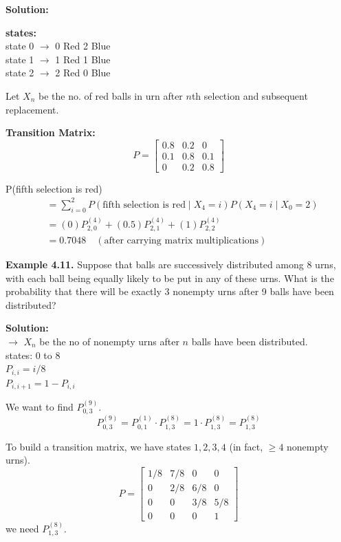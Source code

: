 \documentclass[12pt,a4paper]{article}
\begin{document}
\textbf{Solution:}

\vspace{0.2cm}
\begin{minipage}[t]{0.5\textwidth}
\textbf{states:} \\
state 0 $\rightarrow$ 0 Red 2 Blue \\
state 1 $\rightarrow$ 1 Red 1 Blue \\
state 2 $\rightarrow$ 2 Red 0 Blue
\end{minipage}
\begin{minipage}[t]{0.45\textwidth}
Let $X_n$ be the no. of red balls in urn after $n$th selection and subsequent replacement.
\end{minipage}

\vspace{0.5cm}
\textbf{Transition Matrix:}
\[ P = \begin{bmatrix} 0.8 & 0.2 & 0 \\ 0.1 & 0.8 & 0.1 \\ 0 & 0.2 & 0.8 \end{bmatrix} \]

P(fifth selection is red)
\begin{align*}
    &= \sum_{i=0}^2 P(\text{fifth selection is red} \mid X_4 = i) P(X_4 = i \mid X_0 = 2) \\
    &= (0) P_{2,0}^{(4)} + (0.5) P_{2,1}^{(4)} + (1) P_{2,2}^{(4)} \\
    &= 0.7048 \quad (\text{after carrying matrix multiplications})
\end{align*}

\newpage

\textbf{Example 4.11.} Suppose that balls are successively distributed among 8 urns, with
each ball being equally likely to be put in any of these urns. What is the probability
that there will be exactly 3 nonempty urns after 9 balls have been distributed?

\textbf{Solution:} \\
$\rightarrow$ $X_n$ be the no of nonempty urns after $n$ balls have been distributed. \\
states: $0$ to $8$ \\
$P_{i,i} = i/8$ \\
$P_{i,i+1} = 1 - P_{i,i}$

We want to find $P_{0,3}^{(9)}$.
\[ P_{0,3}^{(9)} = P_{0,1}^{(1)} \cdot P_{1,3}^{(8)} = 1 \cdot P_{1,3}^{(8)} = P_{1,3}^{(8)} \]

To build a transition matrix, we have states $1, 2, 3, 4$ (in fact, $\geq 4$ nonempty urns).
\[ P = \begin{bmatrix} 1/8 & 7/8 & 0 & 0 \\ 0 & 2/8 & 6/8 & 0 \\ 0 & 0 & 3/8 & 5/8 \\ 0 & 0 & 0 & 1 \end{bmatrix} \]
we need $P_{1,3}^{(8)}$.
\end{document}
